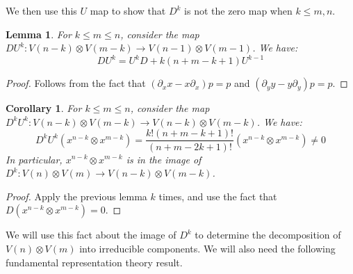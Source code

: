 \documentclass{article}
\newtheorem{lemma}[theorem]{Lemma}
\newtheorem{corollary}[theorem]{Corollary}
\theoremstyle{definition}
\theoremstyle{plain}
\begin{document}
We then use this $U$ map to show that $D^k$ is not the zero map when $k \leq m,n$.

\begin{lemma}
    For $k \leq m \leq n$, consider the map $DU^k: V(n-k) \otimes V(m-k) \rightarrow V(n-1) \otimes V(m-1)$. We have:
    \[
        DU^k = U^kD + k(n+m-k+1)U^{k-1}
    \]
\end{lemma}
\begin{proof}
    Follows from the fact that $(\partial_x x - x\partial_x)p = p$ and $(\partial_y y - y\partial_y)p = p$.
\end{proof}

\begin{corollary}\label{nonzero_cor}
    For $k \leq m \leq n$, consider the map $D^kU^k: V(n-k) \otimes V(m-k) \rightarrow V(n-k) \otimes V(m-k)$. We have:
    \[
        D^kU^k(x^{n-k} \otimes x^{m-k}) = \frac{k!(n+m-k+1)!}{(n+m-2k+1)!} (x^{n-k} \otimes x^{m-k}) \neq 0
    \]
    In particular, $x^{n-k} \otimes x^{m-k}$ is in the image of $D^k: V(n) \otimes V(m) \rightarrow V(n-k) \otimes V(m-k)$.
\end{corollary}
\begin{proof}
    Apply the previous lemma $k$ times, and use the fact that $D(x^{n-k} \otimes x^{m-k}) = 0$.
\end{proof}

We will use this fact about the image of $D^k$ to determine the decomposition of $V(n) \otimes V(m)$ into irreducible components. We will also need the following fundamental representation theory result.
\end{document}
